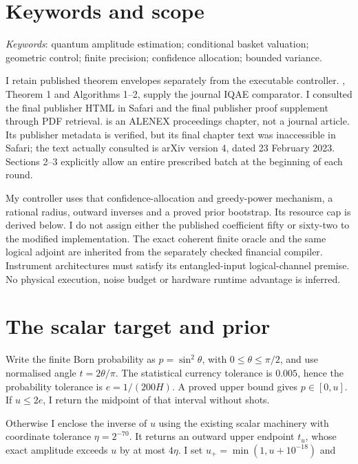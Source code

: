 
\section{Keywords and scope}
\label{sec:miqae-scope}

\emph{Keywords}: quantum amplitude estimation; conditional basket valuation; geometric control; finite precision; confidence allocation; bounded variance.

I retain published theorem envelopes separately from the executable controller. \citet{grinko}, Theorem 1 and Algorithms 1–2, supply the journal IQAE comparator. I consulted the final publisher HTML in Safari and the final publisher proof supplement through PDF retrieval. \citet{fukuzawa} is an ALENEX proceedings chapter, not a journal article. Its publisher metadata is verified, but its final chapter text was inaccessible in Safari; the text actually consulted is arXiv version 4, dated 23 February 2023. Sections 2–3 explicitly allow an entire prescribed batch at the beginning of each round.

My controller uses that confidence-allocation and greedy-power mechanism, a rational radius, outward inverses and a proved prior bootstrap. Its resource cap is derived below. I do not assign either the published coefficient fifty or sixty-two to the modified implementation. The exact coherent finite oracle and the same logical adjoint are inherited from the separately checked financial compiler. Instrument architectures must satisfy its entangled-input logical-channel premise. No physical execution, noise budget or hardware runtime advantage is inferred.

\section{The scalar target and prior}
\label{sec:miqae-prior}

Write the finite Born probability as \(p=\sin^2\theta\), with \(0\leq\theta\leq\pi/2\), and use normalised angle \(t=2\theta/\pi\). The statistical currency tolerance is \(0.005\), hence the probability tolerance is \(e=1/(200H)\). A proved upper bound gives \(p\in[0,u]\). If \(u\leq2e\), I return the midpoint of that interval without shots.

Otherwise I enclose the inverse of \(u\) using the existing scalar machinery with coordinate tolerance \(\eta=2^{-70}\). It returns an outward upper endpoint \(t_u\), whose exact amplitude exceeds \(u\) by at most \(4\eta\). I set \(u_+=\min(1,u+10^{-18})\) and

